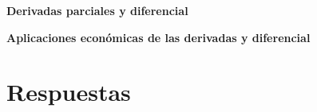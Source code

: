 \documentclass[a4paper,11pt]{article}
\newcommand{\seccionguia}[1]{%
    \par\addvspace{0.45cm}
    \Needspace{4\baselineskip}
    \noindent
    \colorbox{fondoseccion}{%
        \parbox{\dimexpr\linewidth-2\fboxsep\relax}{%
            \raggedright
            \strut\textbf{#1}\strut
        }%
    }%
    \par\nobreak\vspace{0.15cm}
}
\begin{document}
%
%
%
%


\seccionguia{Derivadas parciales y diferencial}

%
%
%


\seccionguia{Aplicaciones económicas de las derivadas y diferencial}

%
%
%


\newpage
\section*{Respuestas}
\end{document}
